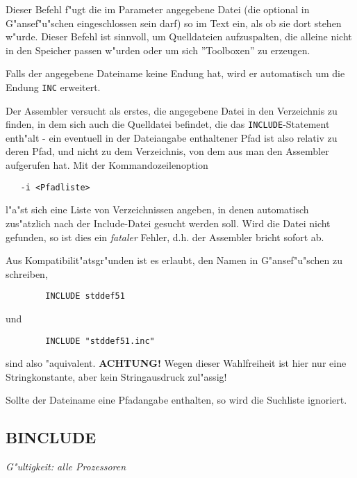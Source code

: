 \documentclass[12pt,a4paper,twoside]{report}
\makeatletter
\newcommand{\ii}[1]{{\it #1}}
\newcommand{\bb}[1]{{\bf #1}}
\newcommand{\tty}[1]{{\tt #1}}
\newcommand{\ttindex}[1]{\index{#1@{\tt #1}}}
\makeatother
\begin{document}
Dieser Befehl f"ugt die im Parameter angegebene Datei (die optional in
G"an\-se\-f"u"s\-chen eingeschlossen sein darf) so im Text ein, als ob sie dort
stehen w"urde.  Dieser Befehl ist sinnvoll, um Quelldateien aufzuspalten,
die alleine nicht in den Speicher passen w"urden oder um sich ''Toolboxen''
zu erzeugen.
\par
Falls der angegebene Dateiname keine Endung hat, wird er automatisch
um die Endung \tty{INC} erweitert.
\par
Der Assembler versucht als erstes, die angegebene Datei in den Verzeichnis
zu finden, in dem sich auch die Quelldatei befindet, die das \tty{INCLUDE}-Statement
enth"alt - ein eventuell in der Dateiangabe enthaltener Pfad ist also relativ
zu deren Pfad, und nicht zu dem Verzeichnis, von dem aus man den Assembler
aufgerufen hat.  Mit der Kommandozeilenoption
\begin{verbatim}
   -i <Pfadliste>
\end{verbatim}
l"a"st sich eine Liste von Verzeichnissen angeben, in denen automatisch
zus"atzlich nach der Include-Datei gesucht werden soll.  Wird die Datei
nicht gefunden, so ist dies ein \ii{fataler} Fehler, d.h. der Assembler
bricht sofort ab.
\par
Aus Kompatibilit"atsgr"unden ist es erlaubt, den Namen in G"ansef"u"schen
zu schreiben,
\begin{verbatim}
        INCLUDE stddef51
\end{verbatim}
und
\begin{verbatim}
        INCLUDE "stddef51.inc"
\end{verbatim}
sind also "aquivalent.  \bb{ACHTUNG!} Wegen dieser Wahlfreiheit ist
hier nur eine Stringkonstante, aber kein Stringausdruck zul"assig!
\par
Sollte der Dateiname eine Pfadangabe enthalten, so wird die Suchliste
ignoriert.


\subsection{BINCLUDE}
\ttindex{BINCLUDE}

{\em G"ultigkeit: alle Prozessoren}
\end{document}
